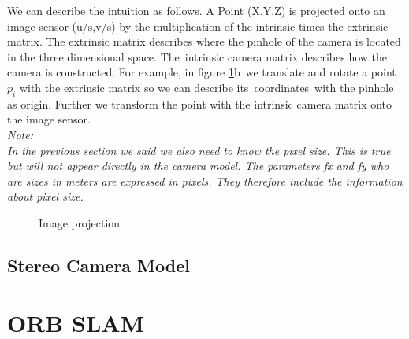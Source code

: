 \documentclass[11pt,a4paper,titlepage,oneside]{report}
\begin{document}
We can describe the intuition as follows. A Point (X,Y,Z) is projected onto an image sensor (u/s,v/s) by the multiplication of the intrinsic times the extrinsic matrix. The extrinsic matrix describes where the pinhole of the camera is located in the three dimensional space. The intrinsic camera matrix describes how the camera is constructed. For example, in figure \ref{fig:projection}b we translate and rotate a point $p_i$ with the extrinsic matrix so we can describe its coordinates with the pinhole as origin. Further we transform the point with the intrinsic camera matrix onto the image sensor.\\
\em
Note:\\
In the previous section we said we also need to know the pixel size. This is true but will not appear directly in the camera model. The parameters fx and fy who are sizes in meters are expressed in pixels. They therefore include the information about pixel size.
\normalfont

\begin{figure}[H]
	\centering
	\caption{Image projection}\label{fig:projection}
\end{figure}

\section{Stereo Camera Model}

\chapter{ORB SLAM}\label{chap:implementation}
\end{document}
